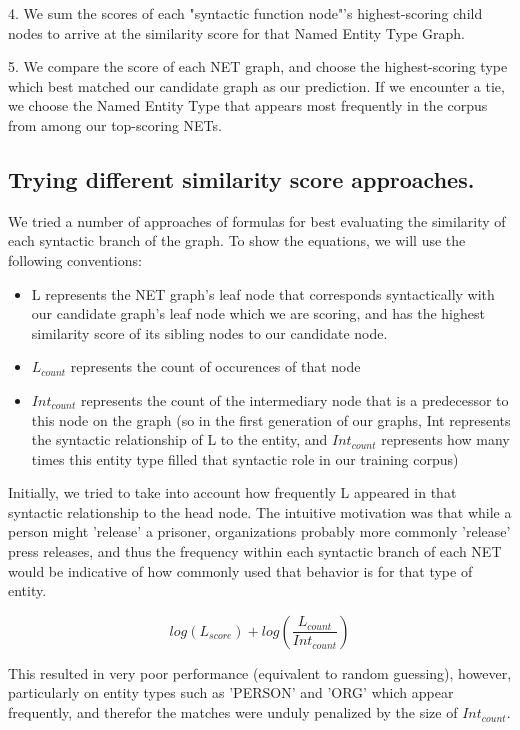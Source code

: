 \documentclass[11pt,a4paper]{article}
\begin{document}
4. We sum the scores of each "syntactic function node"'s highest-scoring child nodes to arrive at the similarity score for that Named Entity Type Graph.

5. We compare the score of each NET graph, and choose the highest-scoring type which best matched our candidate graph as our prediction. If we encounter a tie, we choose the Named Entity Type that appears most frequently in the corpus from among our top-scoring NETs.

\subsection{Trying different similarity score approaches.} \label{sim_scores}

We tried a number of approaches of formulas for best evaluating the similarity of each syntactic branch of the graph. To show the equations, we will use the following conventions:

\begin{itemize}
\item L represents the NET graph's leaf node that corresponds syntactically with our candidate graph's leaf node which we are scoring, and has the highest similarity score of its sibling nodes to our candidate node.
\item $L_{count}$ represents the count of occurences of that node
\item $Int_{count}$ represents the count of the intermediary node that is a predecessor to this node on the graph (so in the first generation of our graphs, Int represents the syntactic relationship of L to the entity, and $Int_{count}$ represents how many times this entity type filled that syntactic role in our training corpus)
\end{itemize}

Initially, we tried to take into account how frequently L appeared in that syntactic relationship to the head node. The intuitive motivation was that while a person might 'release' a prisoner, organizations probably more commonly 'release' press releases, and thus the frequency within each syntactic branch of each NET would be indicative of how commonly used that behavior is for that type of entity.

$$ log(L_{score}) + log(\frac{L_{count}}{Int_{count}}) $$

This resulted in very poor performance (equivalent to random guessing), however, particularly on entity types such as 'PERSON' and 'ORG' which appear frequently, and therefor the matches were unduly penalized by the size of $Int_{count}$.
\end{document}

